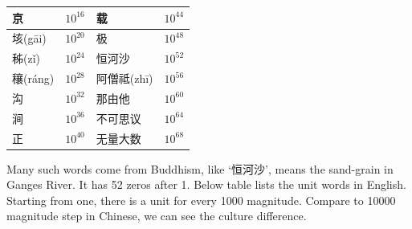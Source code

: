 \documentclass{article}
\begin{document}
\begin{center}
\begin{tabular}{|l|r|l|r|}
\hline
{\fontspec{\cnmainft}京}            & $10^{16}$ & {\fontspec{\cnmainft}载}            & $10^{44}$ \\
\hline
{\fontspec{\cnmainft}垓}(g\={a}i)   & $10^{20}$ & {\fontspec{\cnmainft}极}            & $10^{48}$ \\
\hline
{\fontspec{\cnmainft}秭}(z\v{i})    & $10^{24}$ & {\fontspec{\cnboldft}恒河沙}  & $10^{52}$ \\
\hline
{\fontspec{\cnmainft}穰}(r\'{a}ng)  & $10^{28}$ & {\fontspec{\cnmainft}阿僧祗}(zh\={i})  & $10^{56}$ \\
\hline
{\fontspec{\cnmainft}沟}            & $10^{32}$ & {\fontspec{\cnmainft}那由他}        & $10^{60}$ \\
\hline
{\fontspec{\cnmainft}涧}            & $10^{36}$ & {\fontspec{\cnmainft}不可思议}      & $10^{64}$ \\
\hline
{\fontspec{\cnmainft}正}            & $10^{40}$ & {\fontspec{\cnmainft}无量大数}      & $10^{68}$ \\
\hline
\end{tabular}
\end{center}

Many such words come from Buddhism, like `{\fontspec{\cnmainft}恒河沙}', means the sand-grain in Ganges River. It has 52 zeros after 1. Below table lists the unit words in English. Starting from one, there is a unit for every 1000 magnitude. Compare to 10000 magnitude step in Chinese, we can see the culture difference.
\end{document}
